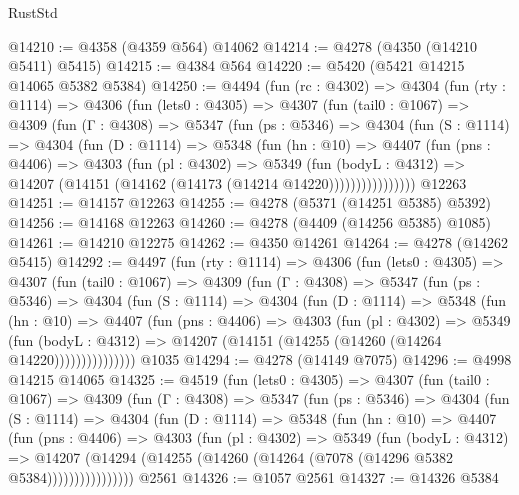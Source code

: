 \begin{lexlean}{RustStd}
\begin{coremodule}
@14210 := @4358 (@4359 @564) @14062
@14214 := @4278 (@4350 (@14210 @5411) @5415)
@14215 := @4384 @564
@14220 := @5420 (@5421 @14215 @14065 @5382 @5384)
@14250 := @4494
    (fun (rc : @4302) =>
    @4304
      (fun (rty : @1114) =>
      @4306
        (fun (lets0 : @4305) =>
        @4307
          (fun (tail0 : @1067) =>
          @4309
            (fun (Γ : @4308) =>
            @5347
              (fun (ps : @5346) =>
              @4304
                (fun (S : @1114) =>
                @4304
                  (fun (D : @1114) =>
                  @5348
                    (fun (hn : @10) =>
                    @4407
                      (fun (pns : @4406) =>
                      @4303
                        (fun (pl : @4302) =>
                        @5349
                          (fun (bodyL : @4312) =>
                          @14207 (@14151 (@14162 (@14173 (@14214 @14220))))))))))))))))
    @12263
@14251 := @14157 @12263
@14255 := @4278 (@5371 (@14251 @5385) @5392)
@14256 := @14168 @12263
@14260 := @4278 (@4409 (@14256 @5385) @1085)
@14261 := @14210 @12275
@14262 := @4350 @14261
@14264 := @4278 (@14262 @5415)
@14292 := @4497
    (fun (rty : @1114) =>
    @4306
      (fun (lets0 : @4305) =>
      @4307
        (fun (tail0 : @1067) =>
        @4309
          (fun (Γ : @4308) =>
          @5347
            (fun (ps : @5346) =>
            @4304
              (fun (S : @1114) =>
              @4304
                (fun (D : @1114) =>
                @5348
                  (fun (hn : @10) =>
                  @4407
                    (fun (pns : @4406) =>
                    @4303
                      (fun (pl : @4302) =>
                      @5349
                        (fun (bodyL : @4312) =>
                        @14207 (@14151 (@14255 (@14260 (@14264 @14220)))))))))))))))
    @1035
@14294 := @4278 (@14149 @7075)
@14296 := @4998 @14215 @14065
@14325 := @4519
    (fun (lets0 : @4305) =>
    @4307
      (fun (tail0 : @1067) =>
      @4309
        (fun (Γ : @4308) =>
        @5347
          (fun (ps : @5346) =>
          @4304
            (fun (S : @1114) =>
            @4304
              (fun (D : @1114) =>
              @5348
                (fun (hn : @10) =>
                @4407
                  (fun (pns : @4406) =>
                  @4303
                    (fun (pl : @4302) =>
                    @5349
                      (fun (bodyL : @4312) =>
                      @14207
                        (@14294 (@14255 (@14260 (@14264 (@7078 (@14296 @5382 @5384))))))))))))))))
    @2561
@14326 := @1057 @2561
@14327 := @14326 @5384

\end{coremodule}
\end{lexlean}
